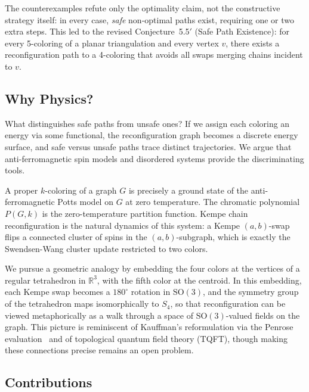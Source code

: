 The counterexamples refute only the optimality claim, not the
constructive strategy itself: in every case, \emph{safe} non-optimal paths
exist, requiring one or two extra steps. This led to the revised
Conjecture~5.5$'$ (Safe Path Existence): for every 5-coloring of a
planar triangulation and every vertex $v$, there exists a
reconfiguration path to a 4-coloring that avoids all swaps merging
chains incident to $v$.

\subsection{Why Physics?}

What distinguishes safe paths from unsafe ones? If we assign each
coloring an energy via some functional, the reconfiguration graph becomes
a discrete energy surface, and safe versus unsafe paths trace distinct
trajectories. We argue that anti-ferromagnetic spin models and disordered
systems provide the discriminating tools.

A proper $k$-coloring of a
graph $G$ is precisely a ground state of the anti-ferromagnetic Potts
model on $G$ at zero temperature. The chromatic polynomial $P(G, k)$ is
the zero-temperature partition function. Kempe chain reconfiguration is
the natural dynamics of this system: a Kempe $(a,b)$-swap flips a
connected cluster of spins in the $(a,b)$-subgraph, which is exactly
the Swendsen-Wang cluster update restricted to two colors.

We pursue a geometric analogy by embedding the four colors at the
vertices of a regular tetrahedron in $\mathbb{R}^3$, with the fifth
color at the centroid. In this embedding, each Kempe swap becomes a
$180^\circ$ rotation in $\mathrm{SO}(3)$, and the symmetry group of the
tetrahedron maps isomorphically to $S_4$, so that reconfiguration
can be viewed metaphorically as a walk through a space of
$\mathrm{SO}(3)$-valued fields on the graph. This picture is
reminiscent of Kauffman's reformulation via the Penrose
evaluation~\cite{kauffman1990} and of topological quantum field theory
(TQFT), though making these connections precise remains an open
problem.

\subsection{Contributions}

